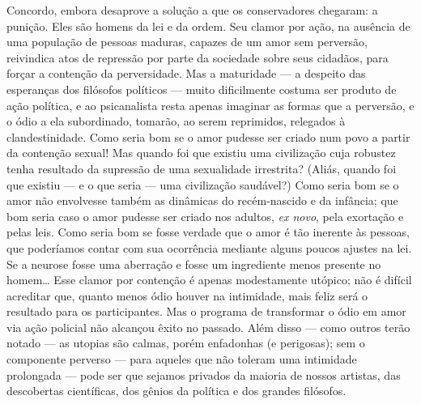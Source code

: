 Concordo, embora desaprove a solução a que os conservadores
chegaram: a punição. Eles são homens da lei e da ordem. Seu clamor por
ação, na ausência de uma população de pessoas maduras, capazes de um
amor sem perversão, reivindica atos de repressão por parte da sociedade
sobre seus cidadãos, para forçar a contenção da perversidade. Mas a
maturidade --- a despeito das esperanças dos filósofos políticos ---
muito dificilmente costuma ser produto de ação política, e ao
psicanalista resta apenas imaginar as formas que a perversão, e o ódio
a ela subordinado, tomarão, ao serem reprimidos, relegados à
clandestinidade. Como seria bom se o amor pudesse ser criado num povo a
partir da contenção sexual! Mas quando foi que existiu uma civilização
cuja robustez tenha resultado da supressão de uma sexualidade
irrestrita? (Aliás, quando foi que existiu --- e o que seria --- uma
civilização saudável?) Como seria bom se o amor não envolvesse também
as dinâmicas do recém-nascido e da infância; que bom seria caso o amor
pudesse ser criado nos adultos, \textit{ex novo}, pela exortação e
pelas leis.\idxcria{} Como seria bom se fosse verdade que o amor é tão inerente
às pessoas, que poderíamos contar com sua ocorrência mediante alguns
poucos ajustes na lei. Se a neurose fosse uma aberração e fosse um
ingrediente menos presente no homem\ldots{} Esse clamor por contenção é
apenas modestamente utópico; não é difícil acreditar que, quanto menos
ódio houver na intimidade, mais feliz será o resultado para os
participantes. Mas o programa de transformar o ódio em amor via ação
policial não alcançou êxito no passado. Além disso --- como outros
terão notado --- as utopias são calmas, porém enfadonhas (e
perigosas); sem o componente perverso --- para aqueles que não toleram
uma intimidade prolongada --- pode ser que sejamos privados da maioria
de nossos artistas, das descobertas científicas, dos gênios da política
e dos grandes filósofos.\idxaspeccon[|)]

